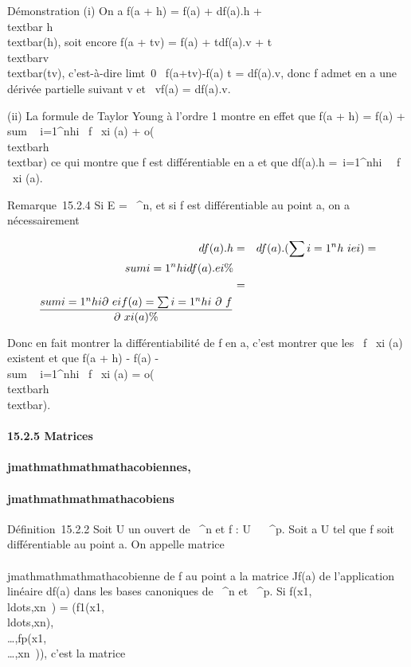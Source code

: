 Démonstration (i) On a f(a + h) = f(a) + df(a).h
+\\textbar{} h\\textbar{}\epsilon(h), soit encore
f(a + tv) = f(a) + tdf(a).v +
\textbar{}t\textbar{}\,\\textbar{}v\\textbar{}\epsilon(tv),
c'est-à-dire limt\rightarrow~0~ f(a+tv)-f(a)
\over t = df(a).v, donc f admet en a une dérivée
partielle suivant v et \partial~vf(a) = df(a).v.

(ii) La formule de Taylor Young à l'ordre 1 montre en effet que f(a + h)
= f(a) + \\sum ~
i=1^nhi \partial~f \over
\partial~xi (a) +
o(\\textbar{}h\\textbar{}) ce qui montre
que f est différentiable en a et que df(a).h =\
\sum  i=1^nhi~ \partial~f
\over \partial~xi (a).

Remarque~15.2.4 Si E = ~^n, et si f est différentiable au
point a, on a nécessairement

\begin{align*} df(a).h& =&
df(a).(\sum i=1^nh~
iei) = \\sum
i=1^nh idf(a).ei\%&
\\ & =& \\sum
i=1^nh i\partial~eif(a) =
\sum i=1^nh i~ \partial~f
\over \partial~xi (a) \%&
\\ \end{align*}

Donc en fait montrer la différentiabilité de f en a, c'est montrer que
les  \partial~f \over \partial~xi (a) existent et que f(a +
h) - f(a) -\\sum ~
i=1^nhi \partial~f \over
\partial~xi (a) =
o(\\textbar{}h\\textbar{}).

\paragraph{15.2.5 Matrices \\\\jmathmathmathmathacobiennes, \\\\jmathmathmathmathacobiens}

Définition~15.2.2 Soit U un ouvert de ~^n et f : U \rightarrow~
\mathbb{R}~^p. Soit a \in U tel que f soit différentiable au point a. On
appelle matrice \\\\jmathmathmathmathacobienne de f au point a la matrice Jf(a) de
l'application linéaire df(a) dans les bases canoniques de ~^n
et \mathbb{R}~^p. Si
f(x1,\\ldots,xn~)
=
(f1(x1,\\ldots,xn),\\\ldots,fp(x1,\\\ldots,xn~)),
c'est la matrice

